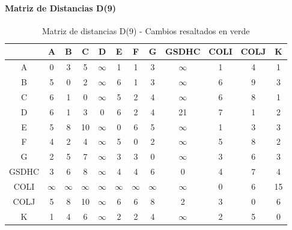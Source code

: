 \documentclass[12pt]{article}
\begin{document}
\paragraph{Matriz de Distancias D(9)}
\begin{table}[h!]
\centering
\begin{tabular}{|c|c|c|c|c|c|c|c|c|c|c|c|}
\hline
 & A & B & C & D & E & F & G & GSDHC & COLI & COLJ & K \\\hline
A & 0 & 3 & 5 & $\infty$ & 1 & 1 & 3 & $\infty$ & 1 & 4 & 1 \\\hline
B & 5 & 0 & 2 & $\infty$ & 6 & 1 & 3 & $\infty$ & 6 & 9 & 3 \\\hline
C & 6 & 1 & 0 & $\infty$ & 5 & 2 & 4 & $\infty$ & 6 & 8 & 1 \\\hline
D & 6 & 1 & 3 & 0 & 6 & 2 & 4 & 21 & 7 & 1 & 2 \\\hline
E & 5 & 8 & 10 & $\infty$ & 0 & 6 & 5 & $\infty$ & 1 & 3 & 3 \\\hline
F & 4 & 2 & 4 & $\infty$ & 5 & 0 & 2 & $\infty$ & 5 & 8 & 2 \\\hline
G & 2 & 5 & 7 & $\infty$ & 3 & 3 & 0 & $\infty$ & 3 & 6 & 3 \\\hline
GSDHC & 3 & 6 & 8 & $\infty$ & 4 & 4 & 6 & 0 & 4 & 7 & 4 \\\hline
COLI & $\infty$ & $\infty$ & $\infty$ & $\infty$ & $\infty$ & $\infty$ & $\infty$ & $\infty$ & 0 & 6 & 15 \\\hline
COLJ & 5 & 8 & 10 & $\infty$ & 6 & 6 & 8 & 2 & 3 & 0 & 6 \\\hline
K & 1 & 4 & 6 & $\infty$ & 2 & 2 & 4 & $\infty$ & 2 & 5 & 0 \\\hline
\end{tabular}
\caption{Matriz de distancias D(9) - Cambios resaltados en verde}
\end{table}
\end{document}
